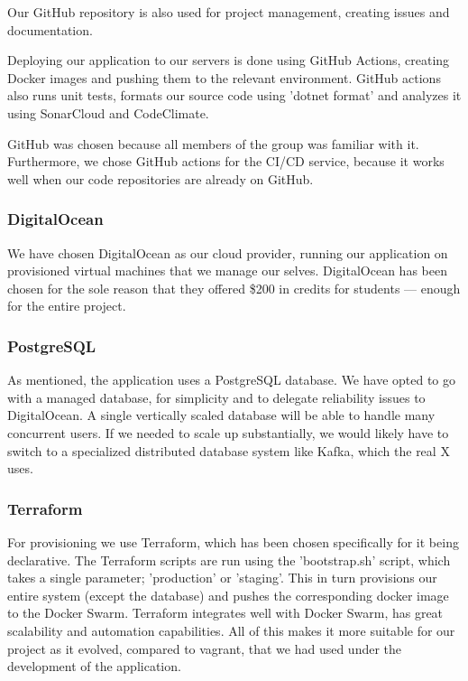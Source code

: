 Our GitHub repository is also used for project management, creating issues and documentation.

Deploying our application to our servers is done using GitHub Actions, creating Docker images and pushing them to the relevant environment. GitHub actions also runs unit tests, formats our source code using 'dotnet format' and analyzes it using SonarCloud and CodeClimate.

GitHub was chosen because all members of the group was familiar with it. Furthermore, we chose GitHub actions for the CI/CD service, because it works well when our code repositories are already on GitHub. 

\subsubsection{DigitalOcean}
We have chosen DigitalOcean as our cloud provider, running our application on provisioned virtual machines that we manage our selves. DigitalOcean has been chosen for the sole reason that they offered \$200 in credits for students — enough for the entire project.

\subsubsection{PostgreSQL}
As mentioned, the application uses a PostgreSQL database. We have opted to go with a managed database, for simplicity and to delegate reliability issues to DigitalOcean. A single vertically scaled database will be able to handle many concurrent users. If we needed to scale up substantially, we would likely have to switch to a specialized distributed database system like Kafka, which the real X uses\cite{kafka}.

\subsubsection{Terraform}
For provisioning we use Terraform, which has been chosen specifically for it being declarative. The Terraform scripts are run using the 'bootstrap.sh' script, which takes a single parameter; 'production' or 'staging'. This in turn provisions our entire system (except the database) and pushes the corresponding docker image to the Docker Swarm. Terraform integrates well with Docker Swarm, has great scalability and automation capabilities. All of this makes it more suitable for our project as it evolved, compared to vagrant, that we had used under the development of the application. 

